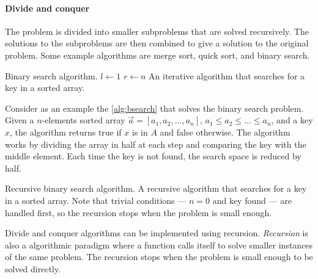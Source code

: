 \paragraph{Divide and conquer}  The problem is divided into smaller subproblems that are
solved recursively.  The solutions to the subproblems are then combined to give a solution
to the original problem.  Some example algorithms are merge sort, quick sort, and binary
search.

\begin{algobox}[label=alg:bsearch]{Binary search algorithm.}
  $l \gets 1$\;
  $r \gets n$\;
  \tcblower
  An iterative algorithm that searches for a key in a sorted array.
\end{algobox}

Consider as an example the \cref{alg:bsearch} that solves the binary search problem.  Given a
$n$-elements sorted array $\vec{a} = \left[a_1, a_2, \dots, a_n\right]$, $a_1 \leq a_2 \leq
\dots \leq a_n$, and a key $x$, the algorithm returns true if $x$ is in $A$ and false
otherwise.  The algorithm works by dividing the array in half at each step and comparing
the key with the middle element.  Each time the key is not found, the search space is
reduced by half.

\begin{algobox}[label=alg:bsearch2]{Recursive binary search algorithm.}
  \tcblower
  A recursive algorithm that searches for a key in a sorted array.  Note that trivial
  conditions --- $n = 0$ and key found --- are handled first, so the recursion stops
  when the problem is small enough.
\end{algobox}

Divide and conquer algorithms can be implemented using recursion.  \emph{Recursion}
is also a algorithmic paradigm where a function calls itself to solve smaller instances of the
same problem.  The recursion stops when the problem is small enough to be solved directly.

